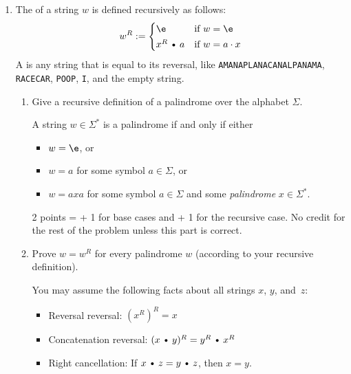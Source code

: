 \documentclass[11pt]{article}
\def\Cdot{\mathbin{\text{\normalfont \textbullet}}}
\def\Sym#1{\texttt{\color{BrickRed}#1}}
\begin{document}
\begin{enumerate}
\begin{enumerate}
\begin{rubric}
5 points: Standard induction rubric (scaled).  This is more detail than necessary for full credit.
\end{rubric}

\end{enumerate}

\newpage
\item
The  of a string $w$ is defined recursively as follows:
\[	
	w^R := \begin{cases}
		\e & \text{if $w=\e$} \\[0.5ex]
		x^R \Cdot a & \text{if $w=a\cdot x$}
	\end{cases}
\]
A  is any string that is equal to its reversal, like \Sym{AMANAPLANACANALPANAMA}, \hbox{\Sym{RACECAR}}, \Sym{POOP}, \Sym{I}, and the empty string.

\begin{enumerate}
\item
Give a recursive definition of a palindrome over the alphabet $\Sigma$.

\begin{Solution}
A string $w\in\Sigma^*$ is a palindrome if and only if either
\begin{itemize}
\item $w = \e$, or
\item $w = a$ for some symbol $a\in\Sigma$, or
\item $w = axa$ for some symbol $a\in\Sigma$ and some \emph{palindrome} $x\in\Sigma^*$.
\end{itemize}
\end{Solution}
\unskip
\begin{rubric}
2 points = + 1 for base cases and + 1 for the recursive case.
No credit for the rest of the problem unless this part is correct.
\end{rubric}

\item
Prove $w = w^R$ for every palindrome $w$ (according to your recursive definition).  

You may assume the following facts about all strings $x$, $y$, and~$z$:
\begin{itemize}
\item Reversal reversal: $(x^R)^R = x$
\item Concatenation reversal: $(x\Cdot y)^R = y^R\Cdot x^R$
\item Right cancellation:  If $x\Cdot z = y\Cdot z$, then $x = y$.
\end{itemize}



\end{enumerate}
\end{enumerate}
\end{document}
